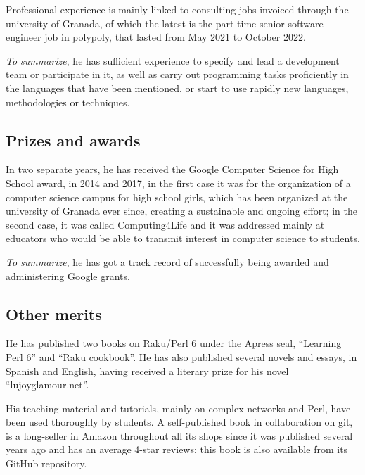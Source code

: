 \documentclass[a4paper,12pt]{article}
\begin{document}
Professional experience is mainly linked to consulting jobs invoiced through the
university of Granada, of which the latest is the part-time senior software
engineer job in polypoly, that lasted from May 2021 to October 2022.

{\em To summarize}, he has sufficient experience to specify and lead a development
team or participate in it, as well as carry out programming tasks proficiently
in the languages that have been mentioned, or start to use rapidly new
languages, methodologies or techniques.

\subsection{Prizes and awards}

In two separate years, he has received the Google Computer Science for High
School award, in 2014 and 2017, in the first case it was for the organization of
a computer science campus for high school girls, which has been organized at the
university of Granada ever since, creating a sustainable and ongoing effort; in
the second case, it was called Computing4Life and it was addressed mainly at
educators who would be able to transmit interest in computer science to
students.

{\em To summarize}, he has got a track record of successfully being awarded and
administering Google grants.

\subsection{Other merits}

He has published two books on Raku/Perl 6 under the Apress seal, ``Learning Perl
6'' and ``Raku cookbook''. He has also published several novels and essays, in
Spanish and English, having received a literary prize for his novel
``lujoyglamour.net''.

His teaching material and tutorials, mainly on complex networks and Perl, have
been used thoroughly by students. A self-published book in collaboration on
git, is a long-seller in Amazon throughout all its shops since it was published
several years ago and has an average 4-star reviews; this book is also
available from its GitHub repository.





\end{document}
